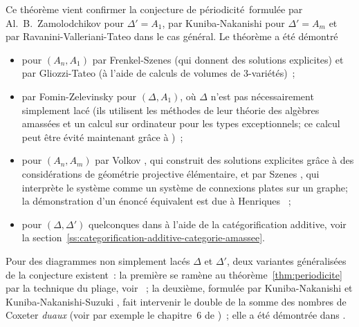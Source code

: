 \documentclass[brochure,12pt]{bourbaki}
\newcommand{\og}{\guillemotleft\hspace*{1pt}}
\newcommand{\fg}{\hspace*{1pt}\guillemotright}
\numberwithin{equation}{subsection}
\numberwithin{theorem}{section}
\begin{document}
Ce th\'eor\`eme vient confirmer la \og conjecture de p\'eriodicit\'e\fg\
formul\'ee par Al.~B.~Za\-mo\-lod\-chi\-kov \cite[(12)]{Zamolodchikov91}
pour $\Delta'=A_1$, par Kuniba-Nakanishi \cite[(2a)]{KunibaNakanishi92}
pour $\Delta'=A_m$ et par Ravanini-Valleriani-Tateo
\cite[(6.2)]{RavaniniTateoValleriani93} dans le cas g\'en\'eral. Le
th\'eor\`eme a \'et\'e d\'emontr\'e
\begin{itemize}

\item pour $(A_n, A_1)$  par Frenkel-Szenes \cite{FrenkelSzenes95}
(qui donnent des solutions explicites) et par Gliozzi-Tateo
\cite{GliozziTateo96} (\`a l'aide de calculs de volumes de
$3$-vari\'et\'es)~;

\item par Fomin-Zelevinsky \cite{FominZelevinsky03b} pour $(\Delta, A_1)$,
o\`u $\Delta$ n'est pas n\'ecessairement simplement lac\'e (ils utilisent
les m\'ethodes de leur th\'eorie des alg\`ebres amass\'ees et un
calcul sur ordinateur pour les types exceptionnels; ce calcul
peut \^etre \'evit\'e maintenant gr\^ace \`a \cite{YangZelevinsky09})~;

\item pour $(A_n, A_m)$ par Volkov \cite{Volkov07}, qui construit des
  solutions explicites gr\^ace \`a des consid\'erations
  de g\'eom\'etrie projective \'el\'ementaire, et par Szenes
  \cite{Szenes06}, qui interpr\`ete le syst\`eme comme un syst\`eme de
  connexions plates sur un graphe; la d\'emonstration d'un \'enonc\'e \'equivalent est due
  \`a Henriques \cite{Henriques07}~;

\item pour $(\Delta, \Delta')$ quelconques dans \cite{Keller08c} \cite{Keller10a} \`a l'aide de
la cat\'egorification additive, voir la
section~\ref{ss:categorification-additive-categorie-amassee}.


\end{itemize}

Pour des diagrammes non simplement lac\'es $\Delta$ et $\Delta'$, deux
variantes g\'en\'eralis\'ees de la conjecture existent~: la premi\`ere
se ram\`ene au th\'eor\`eme~\ref{thm:periodicite} par la technique du
\og pliage\fg, voir \cite{FominZelevinsky03b}~; la deuxi\`eme,
formul\'ee par Kuniba-Nakanishi \cite[(2a)]{KunibaNakanishi92} et
Kuniba-Nakanishi-Suzuki \cite[B.6]{KunibaNakanishiSuzuki94}, fait
intervenir le double de la somme des nombres de Coxeter {\em duaux}
(voir par exemple le chapitre~6 de \cite{Kac90})~; elle a
\'et\'e d\'emontr\'ee dans 
\cite{InoueIyamaKellerKunibaNakanishi10a}
\cite{InoueIyamaKellerKunibaNakanishi10b}.
\end{document}
